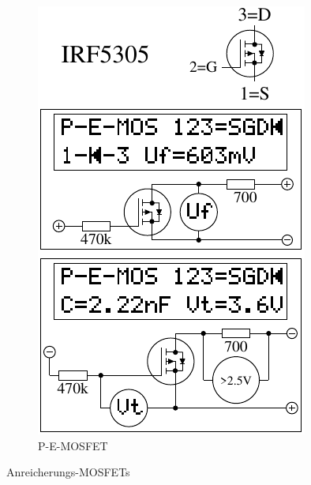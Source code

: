 \begin{figure}[H]
\begin{subfigure}[b]{.5\textwidth}
    \centering
    \includegraphics[width=1.\textwidth]{../FIG/MOS_IRF5305.pdf}
    \caption{P-E-MOSFET}
    \label{fig:MOS-P-E}
  \end{subfigure}
  \caption{Anreicherungs-MOSFETs}
\end{figure}



